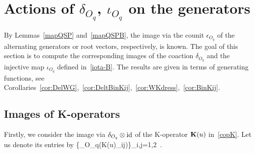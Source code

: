 \documentclass[11pt]{amsart}
\numberwithin{equation}{section}
\numberwithin{equation}{section}
\begin{document}
\section{Actions of  $\delta_{O_q}$, $\iota_{O_q}$ on the generators}\label{sec:actgen}
By Lemmas~\ref{mapQSP} and~\ref{mapQSPB}, the image via the counit $\epsilon_{O_q}$ of the alternating generators or root vectors, respectively, is known. The goal of this section is to compute the corresponding images of the coaction $\delta_{O_q}$ and the injective map $\iota_{O_q}$ defined in~\eqref{iota-B}. The results are given in terms of generating functions, see Corollaries~\ref{cor:DelWG},~\ref{cor:DeltBinKij},~\ref{cor:WKdress},~\ref{cor:BinKij}.

\subsection{Images of K-operators}\label{sec:dressK} 
Firstly, we consider  the image via $\delta_{O_q}\otimes \mathrm{id}$ of the K-operator ${\bold K}(u)$  in~\eqref{copK}. Let us denote its entries by
\beqa
\{\delta_{O_q}\left({\bold K}(u)_{ij}\right)\}_{i,j=1,2}\ .
\eeqa
\end{document}
